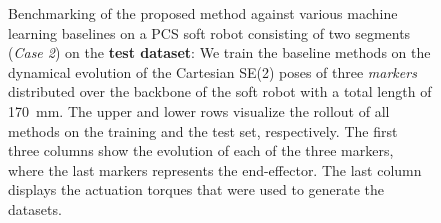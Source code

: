 \begin{figure}[ht]

    \caption{Benchmarking of the proposed method against various machine learning baselines on a PCS soft robot consisting of two segments (\emph{Case 2}) on the \textbf{test dataset}: We train the baseline methods on the dynamical evolution of the Cartesian SE(2) poses of three \emph{markers} distributed over the backbone of the soft robot with a total length of \SI{170}{mm}. The upper and lower rows visualize the rollout of all methods on the training and the test set, respectively. The first three columns show the evolution of each of the three markers, where the last markers represents the end-effector. The last column displays the actuation torques that were used to generate the datasets.}
    \label{fig:pcsregression:dynamics_pcs_ns-2_with_baselines:test}
\end{figure}




